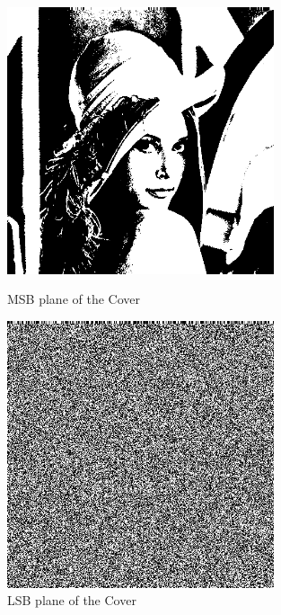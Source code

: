\documentclass{report}
\begin{document}
\begin{figure}[H]
\centering
\begin{minipage}{0.46\linewidth}
\centering
\includegraphics[width=0.7\textwidth]{images/covermsb.png}
\caption{MSB plane of the Cover}
\end{minipage}
\hfill
\begin{minipage}{0.46\linewidth}
\centering
\includegraphics[width=0.7\textwidth]{images/coverlsb.png}
\caption{LSB plane of the Cover}
\end{minipage}
\end{figure}
\end{document}
